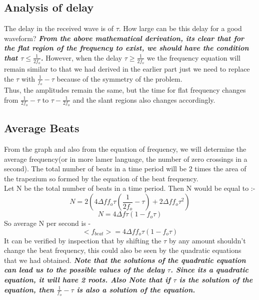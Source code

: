\documentclass[12pt]{article}
\begin{document}
\subsection*{Analysis of delay}
\begin{flushleft}
The delay in the received wave is of $\tau$. How large can be this delay for a good waveform? \textit{\textbf{From the above mathematical derivation, its clear that for the flat region of the frequency to exist, we should have the condition that \textbf{$\tau \leq \frac{1}{2f_o}$}.}} However, when the delay $\tau \geq \frac{1}{2f_o}$ we the frequency equation will remain similar to that we had derived in the earlier part just we need to replace the $\tau$ with $\frac{1}{f_o}-\tau$ because of the symmetry of the problem.\\
Thus, the amplitudes remain the same, but the time for flat frequency changes from  $\frac{1}{2f_o} - \tau$ to  $\tau-\frac{1}{2f_o}$ and the slant regions also changes accordingly.\\

\subsection*{Average Beats}
\begin{flushleft}
From the graph and also from the equation of frequency, we will determine the average frequency(or in more lamer language, the number of zero crossings in a second). The total number of beats in a time period will be 2 times the area of the trapezium so formed by the equation of the beat frequency. \\
Let N be the total number of beats in a time period. Then N would be equal to :- \\
\[N = 2(4\Delta ff_o\tau(\frac{1}{2f_o}-\tau) + 2\Delta ff_o\tau^2)\]
\[N = 4\Delta f\tau(1-f_o\tau)\]
So average N per second is - 
\[<f_{beat}> =4\Delta ff_o\tau(1-f_o\tau) \]
It can be verified by inspection that by shifting the $\tau$ by any amount shouldn't change the beat frequency, this could also be seen by the quadratic equations that we had obtained.
\textbf{\textit{Note that the solutions of the quadratic equation can lead us to the possible values of the delay $\tau$. Since its a quadratic equation, it will have 2 roots. Also Note that if $\tau$ is the solution of the equation, then $\frac{1}{f_o}- \tau$ is also a solution of the equation.}}
\end{flushleft}
\end{flushleft}
\end{document}
